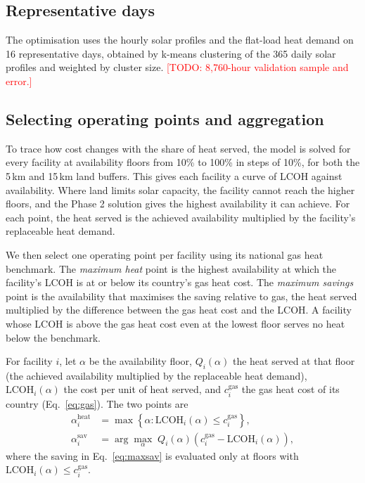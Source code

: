 \documentclass[11pt]{article}
\newcommand{\todo}[1]{\textcolor{red}{[TODO: #1]}}
\begin{document}
\subsection*{Representative days}
The optimisation uses the hourly solar profiles and the flat-load heat demand on 16 representative days, obtained by k-means clustering of the 365 daily solar profiles and weighted by cluster size.
\todo{8,760-hour validation sample and error.}

\subsection*{Selecting operating points and aggregation}
To trace how cost changes with the share of heat served, the model is solved for every facility at availability floors from 10\% to 100\% in steps of 10\%, for both the 5\,km and 15\,km land buffers. This gives each facility a curve of LCOH against availability. Where land limits solar capacity, the facility cannot reach the higher floors, and the Phase 2 solution gives the highest availability it can achieve. For each point, the heat served is the achieved availability multiplied by the facility's replaceable heat demand.

We then select one operating point per facility using its national gas heat benchmark. The \emph{maximum heat} point is the highest availability at which the facility's LCOH is at or below its country's gas heat cost. The \emph{maximum savings} point is the availability that maximises the saving relative to gas, the heat served multiplied by the difference between the gas heat cost and the LCOH. A facility whose LCOH is above the gas heat cost even at the lowest floor serves no heat below the benchmark.

For facility $i$, let $\alpha$ be the availability floor, $Q_i(\alpha)$ the heat served at that floor (the achieved availability multiplied by the replaceable heat demand), $\mathrm{LCOH}_i(\alpha)$ the cost per unit of heat served, and $c^{\mathrm{gas}}_{i}$ the gas heat cost of its country (Eq.~\ref{eq:gas}). The two points are
\begin{align}
\alpha^{\mathrm{heat}}_i &= \max\left\{\alpha : \mathrm{LCOH}_i(\alpha) \leq c^{\mathrm{gas}}_{i}\right\}, \label{eq:maxheat}\\
\alpha^{\mathrm{sav}}_i &= \arg\max_{\alpha}\; Q_i(\alpha) \left(c^{\mathrm{gas}}_{i} - \mathrm{LCOH}_i(\alpha)\right), \label{eq:maxsav}
\end{align}
where the saving in Eq.~\ref{eq:maxsav} is evaluated only at floors with $\mathrm{LCOH}_i(\alpha) \leq c^{\mathrm{gas}}_{i}$.
\end{document}

